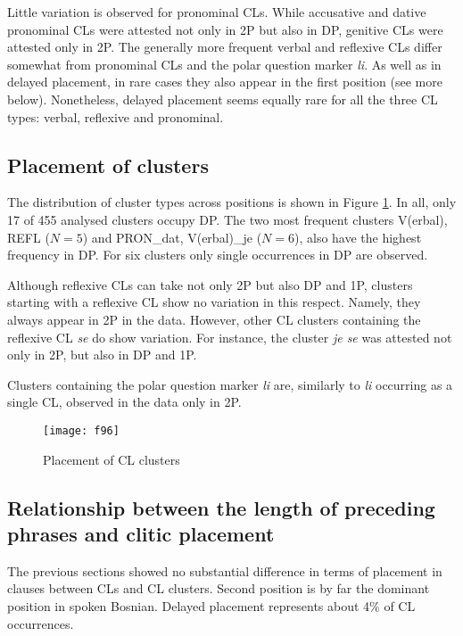Little variation is observed for pronominal CLs. While accusative and dative pronominal CLs were attested not only in 2P but also in DP, genitive CLs were attested only in 2P. The generally more frequent verbal and reflexive CLs differ somewhat from pronominal CLs and the polar question marker \textit{li}. As well as in delayed placement, in rare cases they also appear in the first position (see more below). Nonetheless, delayed placement seems equally rare for all the three CL types: verbal, reflexive and pronominal.

\subsection{Placement of clusters}

The distribution of cluster types across positions is shown in Figure \ref{F.9.6}. In all, only 17 of 455 analysed clusters occupy DP. The two most frequent clusters V(erbal), REFL ($N=5$) and PRON\_dat, V(erbal)\_je ($N=6$), also have the highest frequency in DP. For six clusters only single occurrences in DP are observed. 

Although reflexive CLs can take not only 2P but also DP and 1P, clusters starting with a reflexive CL show no variation in this respect. Namely, they always appear in 2P in the data. However, other CL clusters containing the reflexive CL \textit{se} do show variation. For instance, the cluster \textit{je se} was attested not only in 2P, but also in DP and 1P.

Clusters containing the polar question marker \textit{li} are, similarly to \textit{li} occurring as a single CL, observed in the data only in 2P.

\begin{figure}
\caption{Placement of CL clusters}
\label{F.9.6}
\texttt{[image: f96]}
\end{figure}

\subsection{Relationship between the length of preceding phrases and clitic placement}

The previous sections showed no substantial difference in terms of placement in clauses between CLs and CL clusters. Second position is by far the dominant position in spoken Bosnian. Delayed placement represents about 4\% of CL occurrences. 

